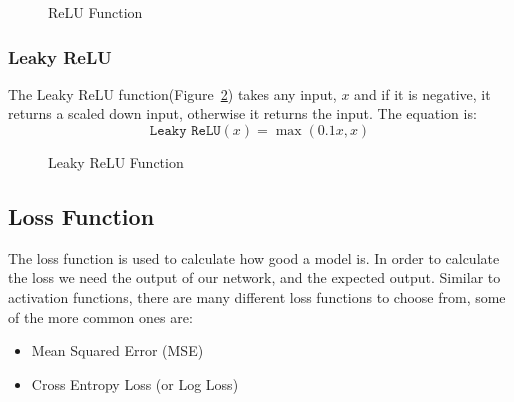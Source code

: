 \documentclass[titlepage]{article}
\begin{document}
\begin{figure}[h!]
    \begin{center}
    \end{center}
    \caption{ReLU Function}  
    \label{fig:relu}
\end{figure}

\subsubsection{Leaky ReLU}
The Leaky ReLU function(Figure~\ref{fig:leaky-relu}) takes any input, $x$ and if it is negative, it returns a scaled down input, otherwise it returns the input. The equation is:
\begin{equation}
    \texttt{Leaky ReLU}(x) = \max(0.1x, x)
    \label{eq:leaky-relu}
\end{equation}
\begin{figure}[h!]
    \begin{center}
    \end{center}
    \caption{Leaky ReLU Function}    
    \label{fig:leaky-relu}
\end{figure}

\subsection{Loss Function}
The loss function is used to calculate how good a model is. In order to calculate the loss we need the output of our network, and the expected output\cite{Loss Functions}. Similar to activation functions, there are many different loss functions to choose from, some of the more common ones are:
\begin{itemize}
    \item Mean Squared Error (MSE)
    \item Cross Entropy Loss (or Log Loss)
\end{itemize}
\end{document}
